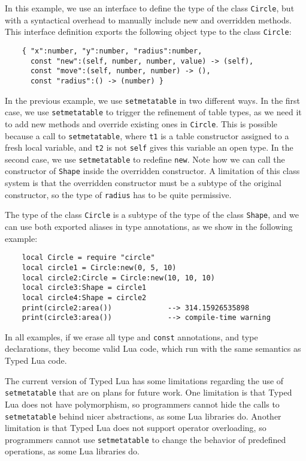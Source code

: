 In this example, we use an interface to define the type of the class \texttt{Circle},
but with a syntactical overhead to manually include new and
overridden methods.
This interface definition exports the following object type to the class \texttt{Circle}:
\begin{verbatim}
    { "x":number, "y":number, "radius":number,
      const "new":(self, number, number, value) -> (self),
      const "move":(self, number, number) -> (),
      const "radius":() -> (number) }
\end{verbatim}

In the previous example, we use \texttt{setmetatable} in two different ways.
In the first case, we use \texttt{setmetatable} to trigger the refinement
of table types, as we need it to add new methods and override existing ones
in \texttt{Circle}.
This is possible because a call to \texttt{setmetatable},
where \texttt{t1} is a table constructor assigned to a fresh local variable,
and \texttt{t2} is not \texttt{self} gives this variable an open type.
In the second case, we use \texttt{setmetatable} to redefine \texttt{new}.
Note how we can call the constructor of \texttt{Shape} inside
the overridden constructor.
A limitation of this class system is that the overridden constructor
must be a subtype of the original constructor,
so the type of \texttt{radius} has to be quite permissive.

The type of the class \texttt{Circle} is a subtype of the type of
the class \texttt{Shape}, and we can use both exported aliases in type
annotations, as we show in the following example:
\begin{verbatim}
    local Circle = require "circle"
    local circle1 = Circle:new(0, 5, 10)
    local circle2:Circle = Circle:new(10, 10, 10)
    local circle3:Shape = circle1
    local circle4:Shape = circle2
    print(circle2:area())             --> 314.15926535898
    print(circle3:area())             --> compile-time warning
\end{verbatim}

In all examples, if we erase all type and \texttt{const} annotations,
and type declarations, they become valid Lua code, which run with the
same semantics as Typed Lua code.

The current version of Typed Lua has some limitations regarding
the use of \texttt{setmetatable} that are on plans for future work.
One limitation is that Typed Lua does not have polymorphism,
so programmers cannot hide the calls to \texttt{setmetatable} behind
nicer abstractions, as some Lua libraries do.
Another limitation is that Typed Lua does not support operator overloading,
so programmers cannot use \texttt{setmetatable} to change the behavior
of predefined operations, as some Lua libraries do.

